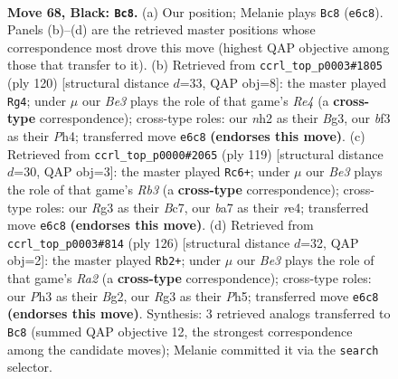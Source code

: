 \documentclass[11pt]{article}
\begin{document}
\clearpage

\begin{figure}[p]\centering
\begin{subfigure}{0.46\textwidth}\centering
\resizebox{\linewidth}{!}{%
\newchessgame
\chessboard[
  setfen={8/B3k3/4b3/2K5/P7/1P3Brp/1R5N/8 b - - 15 68},
  showmover=false,
  pgfstyle=straightmove, color=movearrow, markmove={e6-c8}
]}
\caption{}
\end{subfigure}\hfill
\begin{subfigure}{0.46\textwidth}\centering
\resizebox{\linewidth}{!}{%
\newchessgame
\chessboard[
  setfen={6K1/3k3p/6p1/2b4r/4R2P/6B1/8/8 w - - 1 61},
  showmover=false,
  pgfstyle=straightmove, color=movearrow, markmove={e4-g4}
]}
\caption{}
\end{subfigure}
\\[4pt]
\begin{subfigure}{0.46\textwidth}\centering
\resizebox{\linewidth}{!}{%
\newchessgame
\chessboard[
  setfen={8/2b2k2/1r4p1/8/2K1R2P/1P6/3B4/8 b - - 6 60},
  showmover=false,
  pgfstyle=straightmove, color=movearrow, markmove={b6-c6}
]}
\caption{}
\end{subfigure}\hfill
\begin{subfigure}{0.46\textwidth}\centering
\resizebox{\linewidth}{!}{%
\newchessgame
\chessboard[
  setfen={8/p3r2p/1kPb4/7P/2K5/8/R5B1/8 w - - 9 64},
  showmover=false,
  pgfstyle=straightmove, color=movearrow, markmove={a2-b2}
]}
\caption{}
\end{subfigure}
\caption{\textbf{Move 68, Black: \texttt{Bc8}.} (a) Our position; Melanie plays \texttt{Bc8} (\texttt{e6c8}). Panels (b)--(d) are the retrieved master positions whose correspondence most drove this move (highest QAP objective among those that transfer to it). (b) Retrieved from \texttt{ccrl\_top\_p0003\#1805} (ply 120) [structural distance $d$=33, QAP obj=8]: the master played \texttt{Rg4}; under $\mu$ our \emph{Be3} plays the role of that game's \emph{Re4} (a \textbf{cross-type} correspondence); cross-type roles: our \emph{n}h2 as their \emph{B}g3, our \emph{b}f3 as their \emph{P}h4; transferred move \texttt{e6c8} \textbf{(endorses this move)}. (c) Retrieved from \texttt{ccrl\_top\_p0000\#2065} (ply 119) [structural distance $d$=30, QAP obj=3]: the master played \texttt{Rc6+}; under $\mu$ our \emph{Be3} plays the role of that game's \emph{Rb3} (a \textbf{cross-type} correspondence); cross-type roles: our \emph{R}g3 as their \emph{B}c7, our \emph{b}a7 as their \emph{r}e4; transferred move \texttt{e6c8} \textbf{(endorses this move)}. (d) Retrieved from \texttt{ccrl\_top\_p0003\#814} (ply 126) [structural distance $d$=32, QAP obj=2]: the master played \texttt{Rb2+}; under $\mu$ our \emph{Be3} plays the role of that game's \emph{Ra2} (a \textbf{cross-type} correspondence); cross-type roles: our \emph{P}h3 as their \emph{B}g2, our \emph{R}g3 as their \emph{P}h5; transferred move \texttt{e6c8} \textbf{(endorses this move)}. Synthesis: 3 retrieved analogs transferred to \texttt{Bc8} (summed QAP objective 12, the strongest correspondence among the candidate moves); Melanie committed it via the \texttt{search} selector.}
\label{fig:thought-m135}
\end{figure}
\end{document}
